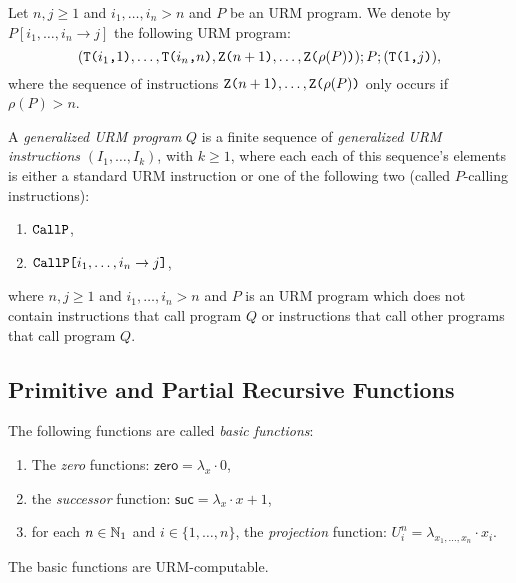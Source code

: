 \begin{definition}
	Let $n, j \geq 1$ and $i_1, \ldots, i_n > n$ and $P$ be an URM program. We denote by $P[i_1, \ldots, i_n \to j]$ the following URM program:
	\[
		(\texttt{T(} i_1 \texttt{,} 1 \texttt{)}, \ldots, \texttt{T(} i_n \texttt{,} n \texttt{)}, \texttt{Z(} n+1 \texttt{)}, \ldots, \texttt{Z(} \rho(P) \texttt{)}); P ; (\texttt{T(} 1 \texttt{,} j \texttt{)}),
	\]
	where the sequence of instructions $\texttt{Z(} n+1 \texttt{)}, \ldots, \texttt{Z(} \rho(P) \texttt{)}$ only occurs if $\rho(P) > n$.
\end{definition}

\begin{definition}
	A \emph{generalized URM program} $Q$ is a finite sequence of \emph{generalized URM instructions} $(I_1, \ldots, I_k)$, with $k \geq 1$, where each each of this sequence's elements is either a standard URM instruction or one of the following two (called $P$-calling instructions):
	\begin{enumerate}
		\item $\texttt{CallP}$,
		\item $\texttt{CallP[} i_1, \ldots, i_n \to j \texttt ]$,
	\end{enumerate}
	where $n,j \geq 1$ and $i_1, \ldots, i_n > n$ and $P$ is an URM program which does not contain instructions that call program $Q$ or instructions that call other programs that call program $Q$.
\end{definition}
\subsection{Primitive and Partial Recursive Functions}
\begin{definition}
	The following functions are called \emph{basic functions}:
	\begin{enumerate}
		\item The \emph{zero} functions: $\mathsf{zero} = \lambda_x \cdot 0$,
		\item the \emph{successor} function: $\mathsf{suc} = \lambda_x \cdot x + 1$,
		\item for each $n \in \mathbb{N}_1$ and $i \in \{ 1, \ldots, n \}$, the \emph{projection} function: $U_i^n = \lambda_{x_1, \ldots, x_n} \cdot x_i$.
	\end{enumerate}
\end{definition}

\begin{theorem}
	The basic functions are URM-computable.
\end{theorem}

